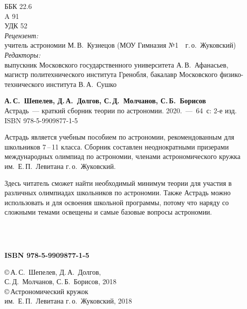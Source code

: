 \newpage
\setcounter{page}{2}
\thispagestyle{empty}
	ББК 22.6\\
	A 91\\
	УДК 52\\[1pc]

{\small {\itshape Рецензент:}\\ учитель астрономии М.\,В.~Кузнецов (МОУ Гимназия №1~~г.\,о.~Жуковский)}\\[1pc]

{\small {\itshape Редакторы:}\\ 
выпускник Московского государственного университета А.\,В.~Афанасьев,\\
магистр политехнического института Гренобля, бакалавр Московского физико-тех\-ни\-чес\-кого института В.\,А.~Сушко\\[1pc]}


{%
{\bfseries А.\,С.~Шепелев, Д.\,А.~Долгов, С.\,Д.~Молчанов, С.\,Б.~Борисов}\\ Астрадь~--- краткий сборник теории по астрономии. 2020.~---~64~с: 2-е изд.}\\ 
ISBN 978-5-9909877-1-5\\[2pc]

\hspace{1pc} {\small Астрадь является учебным пособием по астрономии, рекомендованным для школьников 7\,--\,11 класса. Сборник составлен неоднократными призерами международных олимпиад по астрономии, членами астрономического кружка им.~Е.\,П.~Левитана г.\,о.~Жуковский. 

\hspace{1pc} Здесь читатель сможет найти необходимый минимум теории для участия в различных олимпиадах школьников по астрономии. Также Астрадь можно использовать и для освоения школьной программы, потому что наряду со сложными темами освещены и самые базовые вопросы астрономии.}\\[1pc]

\\ \vfill


\begin{minipage}[t]{0.4\tw}
	{\bfseries ISBN 978-5-9909877-1-5}
\end{minipage}
\hfill
\begin{minipage}[t]{0.57\tw}
	\small
	\copyright\,А.\,С.~Шепелев, Д.\,А.~Долгов,\\
	 \hspace*{8pt} С.\,Д.~Молчанов, С.\,Б.~Борисов, 2018\\[3pt]
	\copyright\,Астрономический кружок\\ \hspace*{8pt} им.~Е.\,П.~Левитана г.\,о.~Жуковский, 2018
\end{minipage}
\newpage